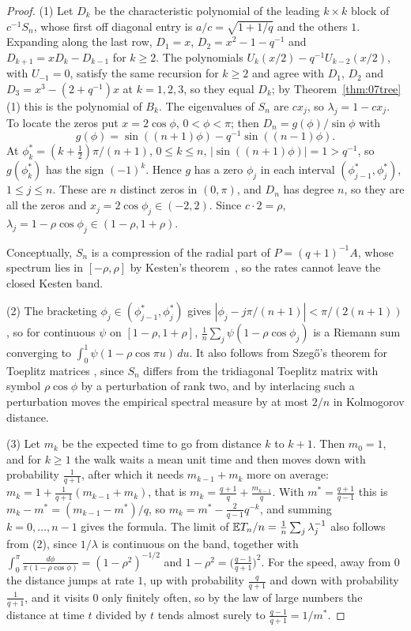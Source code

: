 \begin{proof}
(1) Let $D_k$ be the characteristic polynomial of the leading $k\times k$ block of $c^{-1}S_n$, whose first off diagonal entry is $a/c=\sqrt{1+1/q}$ and the others $1$. Expanding along the last row, $D_1=x$, $D_2=x^2-1-q^{-1}$ and $D_{k+1}=xD_k-D_{k-1}$ for $k\ge2$. The polynomials $U_k(x/2)-q^{-1}U_{k-2}(x/2)$, with $U_{-1}=0$, satisfy the same recursion for $k\ge2$ and agree with $D_1$, $D_2$ and $D_3=x^3-(2+q^{-1})x$ at $k=1,2,3$, so they equal $D_k$; by Theorem~\ref{thm:07tree}(1) this is the polynomial of $B_k$. The eigenvalues of $S_n$ are $cx_j$, so $\lambda_j=1-cx_j$. To locate the zeros put $x=2\cos\phi$, $0<\phi<\pi$; then $D_n=g(\phi)/\sin\phi$ with
\[
g(\phi)=\sin((n+1)\phi)-q^{-1}\sin((n-1)\phi).
\]
At $\phi_k^*=(k+\frac12)\pi/(n+1)$, $0\le k\le n$, $|\sin((n+1)\phi)|=1>q^{-1}$, so $g(\phi_k^*)$ has the sign $(-1)^k$. Hence $g$ has a zero $\phi_j$ in each interval $(\phi_{j-1}^*,\phi_j^*)$, $1\le j\le n$. These are $n$ distinct zeros in $(0,\pi)$, and $D_n$ has degree $n$, so they are all the zeros and $x_j=2\cos\phi_j\in(-2,2)$. Since $c\cdot2=\rho$, $\lambda_j=1-\rho\cos\phi_j\in(1-\rho,1+\rho)$.

Conceptually, $S_n$ is a compression of the radial part of $P=(q+1)^{-1}A$, whose spectrum lies in $[-\rho,\rho]$ by Kesten's theorem~\cite{kesten1959}, so the rates cannot leave the closed Kesten band.

(2) The bracketing $\phi_j\in(\phi_{j-1}^*,\phi_j^*)$ gives $|\phi_j-j\pi/(n+1)|<\pi/(2(n+1))$, so for continuous $\psi$ on $[1-\rho,1+\rho]$, $\frac1n\sum_j\psi(1-\rho\cos\phi_j)$ is a Riemann sum converging to $\int_0^1\psi(1-\rho\cos\pi u)\,du$. It also follows from Szeg\H{o}'s theorem for Toeplitz matrices \cite{grenandersz}, since $S_n$ differs from the tridiagonal Toeplitz matrix with symbol $\rho\cos\phi$ by a perturbation of rank two, and by interlacing such a perturbation moves the empirical spectral measure by at most $2/n$ in Kolmogorov distance.

(3) Let $m_k$ be the expected time to go from distance $k$ to $k+1$. Then $m_0=1$, and for $k\ge1$ the walk waits a mean unit time and then moves down with probability $\frac1{q+1}$, after which it needs $m_{k-1}+m_k$ more on average: $m_k=1+\frac{1}{q+1}(m_{k-1}+m_k)$, that is $m_k=\frac{q+1}{q}+\frac{m_{k-1}}{q}$. With $m^*=\frac{q+1}{q-1}$ this is $m_k-m^*=(m_{k-1}-m^*)/q$, so $m_k=m^*-\frac{2}{q-1}q^{-k}$, and summing $k=0,\dots,n-1$ gives the formula. The limit of $\mathbb{E} T_n/n=\frac1n\sum_j\lambda_j^{-1}$ also follows from (2), since $1/\lambda$ is continuous on the band, together with $\int_0^\pi\frac{d\phi}{\pi(1-\rho\cos\phi)}=(1-\rho^2)^{-1/2}$ and $1-\rho^2=\bigl(\frac{q-1}{q+1}\bigr)^2$. For the speed, away from $0$ the distance jumps at rate $1$, up with probability $\frac q{q+1}$ and down with probability $\frac1{q+1}$, and it visits $0$ only finitely often, so by the law of large numbers the distance at time $t$ divided by $t$ tends almost surely to $\frac{q-1}{q+1}=1/m^*$.


\end{proof}
